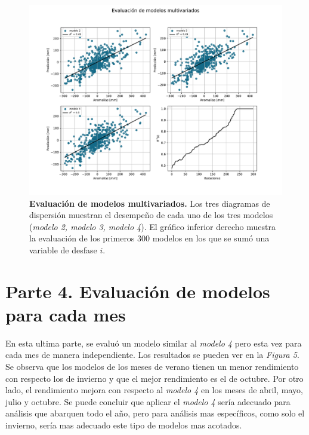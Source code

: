 \begin{figure}[htp!]
\centering
\includegraphics[width=1\textwidth]{img/model234.pdf}
\caption{\textbf{Evaluación de modelos multivariados.} Los tres diagramas de dispersión muestran el desempeño de cada uno de los tres modelos (\textit{modelo 2, modelo 3, modelo 4}). El gráfico inferior derecho muestra la evaluación de los primeros 300 modelos en los que se sumó una variable de desfase $i$.} 
\label{fig:9}
\end{figure}

\newpage

\section*{Parte 4. Evaluación de modelos para cada mes}

\bigskip

En esta ultima parte, se evaluó un modelo similar al \textit{modelo 4} pero esta vez para cada mes de manera independiente. Los resultados se pueden ver en la \textit{Figura 5}. Se observa que los modelos de los meses de verano tienen un menor rendimiento con respecto los de invierno y que el mejor rendimiento es el de octubre. Por otro lado, el rendimiento mejora con respecto al \textit{modelo 4} en los meses de abril, mayo, julio y octubre. Se puede concluir que aplicar el \textit{modelo 4} sería adecuado para análisis que abarquen todo el año, pero para análisis mas específicos, como solo el invierno, sería mas adecuado este tipo de modelos mas acotados. 

\bigskip

